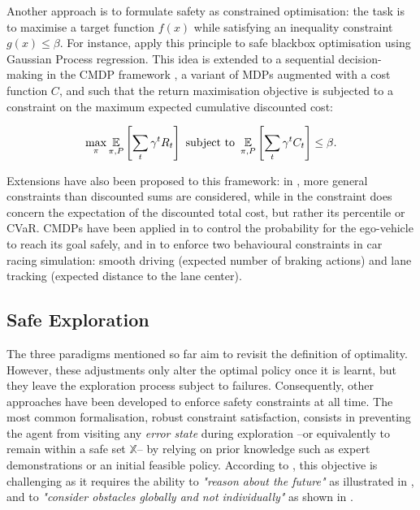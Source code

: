 Another approach is to formulate safety as constrained optimisation: the task is to maximise a target function $f(x)$ while satisfying an inequality constraint $g(x)\leq \beta$. For instance, \citet{Berkenkamp2016} apply this principle to safe blackbox optimisation using Gaussian Process regression. This idea is extended to a sequential decision-making in the \gls{CMDP} framework \citep{Altman1999,Achiam2017}, a variant of \acp*{MDP} augmented with a cost function $C$, and such that the return maximisation objective is subjected to a constraint on the maximum expected cumulative discounted cost:

\begin{equation*}
\max_\pi \operatorname*{\mathbb{E}}_{\pi, P} \left[\sum_t \gamma^t R_t \right] \text{ subject to } \operatorname*{\mathbb{E}}_{\pi, P} \left[\sum_t \gamma^t C_t \right] \leq \beta.
\end{equation*}

Extensions have also been proposed to this framework: in \citep{Tessler2019}, more general constraints than discounted sums are considered, while in \citep{Geibel2005,Chow2018} the constraint does concern the expectation of the discounted total cost, but rather its percentile or \gls{CVaR}. 
\acp*{CMDP} have been applied in \citep{Bouton2019workshop,Bouton2019} to control the probability for the ego-vehicle to reach its goal safely, and in \citep{Le2019} to enforce two behavioural constraints in car racing simulation: smooth driving (expected number of braking actions) and lane tracking (expected distance to the lane center).

\subsection{Safe Exploration}

The three paradigms mentioned so far aim to revisit the definition of optimality. However, these adjustments only alter the optimal policy once it is learnt, but they leave the exploration process subject to failures. Consequently, other approaches have been developed to enforce safety constraints at all time. The most common formalisation, robust constraint satisfaction, consists in preventing the agent from visiting any \emph{error state} during exploration --or equivalently to remain within a safe set $\mathbb{X}$-- by relying on prior knowledge such as expert demonstrations or an initial feasible policy.
According to \citet{Fraichard2014}, this objective is challenging as it requires the ability to \textit{"reason about the future"} as illustrated in , and to \textit{"consider obstacles globally and not individually"} as shown in .

